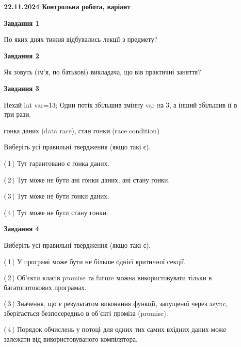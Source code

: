 \documentclass[12pt, ukrainian]{article}
\begin{document}
\begin {large}

\textbf{22.11.2024 Контрольна робота, варіант  }\par


{

\begin{center}
\textbf{Завдання 1}
\end{center}

По яких днях тижня відбувались лекції з предмету?


\begin{center}
\textbf{Завдання 2}
\end{center}

Як зовуть (ім'я, по батькові) викладача, що вів практичні заняття?


\begin{center}
\textbf{Завдання 3}
\end{center}

Нехай int var=13; Один потік збільшив змінну var на 3, а інший збільшив її в три рази.

гонка даних (data race), стан гонки (race condition)

Виберіть усі правильні твердження (якщо такі є).\par
\vspace{2mm}
(\,1\,) Тут гарантовано є гонка даних.%

(\,2\,) Тут може не бути ані гонки даних, ані стану гонки.%

(\,3\,) Тут може не бути гонки даних.%

(\,4\,) Тут може не бути стану гонки.%


\begin{center}
\textbf{Завдання 4}
\end{center}

Виберіть усі правильні твердження (якщо такі є).\par
\vspace{2mm}

(\,1\,) У програмі може бути не більше однієї критичної секції.%

(\,2\,) Об’єкти класів promise та future можна використовувати тільки в багатопотокових програмах.%

(\,3\,) Значення, що є результатом виконання функції, запущеної через async, зберігається безпосередньо в об’єкті проміза (promise).%

(\,4\,) Порядок обчислень у потоці для одних тих самих вхідних даних може залежати від використовуваного компілятора.%


}
\end{large}
\end{document}
